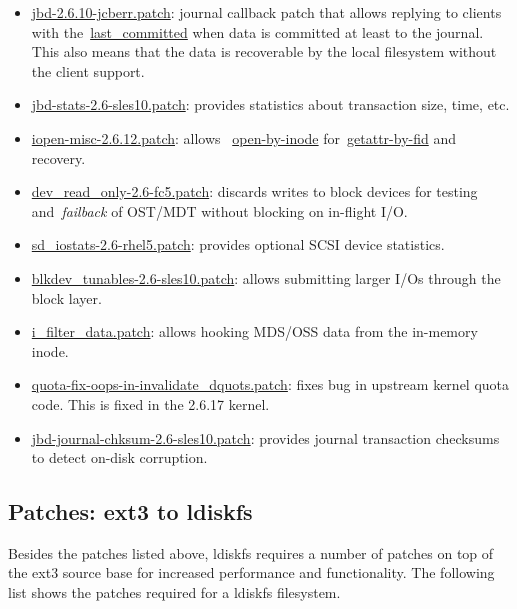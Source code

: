 \begin{itemize}

\item \url{jbd-2.6.10-jcberr.patch}: journal callback patch that allows
replying to clients with the~\url{last_committed} when data is committed at
least to the journal. This also means that the data is  recoverable by the
local filesystem without the client support.

\item \url{jbd-stats-2.6-sles10.patch}: provides statistics about transaction size,
time, etc.

\item \url{iopen-misc-2.6.12.patch}: allows ~\url{open-by-inode}
for~\url{getattr-by-fid} and recovery. 

\item \url{dev_read_only-2.6-fc5.patch}: discards writes to block devices for
testing and~\textit{failback} of OST/MDT without blocking on in-flight I/O.

\item \url{sd_iostats-2.6-rhel5.patch}: provides optional SCSI device statistics.  

\item \url{blkdev_tunables-2.6-sles10.patch}: allows submitting larger I/Os
through the block layer.

\item \url{i_filter_data.patch}: allows hooking MDS/OSS data from the in-memory
inode.

\item \url{quota-fix-oops-in-invalidate_dquots.patch}: fixes bug in upstream
kernel quota code. This is fixed in the 2.6.17 kernel.

\item \url{jbd-journal-chksum-2.6-sles10.patch}: provides journal transaction
checksums to detect on-disk corruption.

\end{itemize}

\subsection{Patches: ext3 to ldiskfs}
\label{ext3-ldiskfs-patches}

Besides the patches listed above, ldiskfs requires a number of patches on top 
of the ext3 source base for increased performance and functionality. The following list 
shows the patches required for a ldiskfs filesystem.


